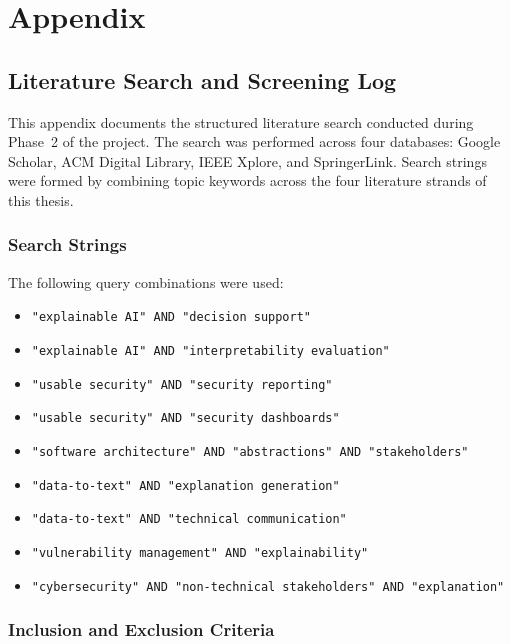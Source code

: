 \chapter{Appendix}%
\label{ch:appendix}

\section{Literature Search and Screening Log}
\label{sec:screening-log}

This appendix documents the structured literature search conducted during Phase~2 of the project. The search was performed across four databases: Google Scholar, ACM Digital Library, IEEE Xplore, and SpringerLink. Search strings were formed by combining topic keywords across the four literature strands of this thesis.

\subsection*{Search Strings}

The following query combinations were used:

\begin{itemize}
  \item \texttt{"explainable AI" AND "decision support"}
  \item \texttt{"explainable AI" AND "interpretability evaluation"}
  \item \texttt{"usable security" AND "security reporting"}
  \item \texttt{"usable security" AND "security dashboards"}
  \item \texttt{"software architecture" AND "abstractions" AND "stakeholders"}
  \item \texttt{"data-to-text" AND "explanation generation"}
  \item \texttt{"data-to-text" AND "technical communication"}
  \item \texttt{"vulnerability management" AND "explainability"}
  \item \texttt{"cybersecurity" AND "non-technical stakeholders" AND "explanation"}
\end{itemize}

\subsection*{Inclusion and Exclusion Criteria}

